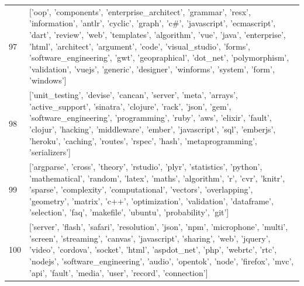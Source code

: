 \begin{center}
\begin{longtable}{|p{1.5cm}|p{12.5cm}|}
            97 & ['oop', 'components', 'enterprise\_architect', 'grammar', 'resx', 'information', 'antlr', 'cyclic', 'graph', 'c\#', 'javascript', 'ecmascript', 'dart', 'review', 'web', 'templates', 'algorithm', 'vue', 'java', 'enterprise', 'html', 'architect', 'argument', 'code', 'visual\_studio', 'forms', 'software\_engineering', 'gwt', 'geopraphical', 'dot\_net', 'polymorphism', 'validation', 'vuejs', 'generic', 'designer', 'winforms', 'system', 'form', 'windows']  \\ 
            98 & ['unit\_testing', 'devise', 'cancan', 'server', 'meta', 'arrays', 'active\_support', 'sinatra', 'clojure', 'rack', 'json', 'gem', 'software\_engineering', 'programming', 'ruby', 'aws', 'elixir', 'fault', 'clojur', 'hacking', 'middleware', 'ember', 'javascript', 'sql', 'emberjs', 'heroku', 'caching', 'routes', 'rspec', 'hash', 'metaprogramming', 'serializers']  \\ 
            99 & ['argparse', 'cross', 'theory', 'rstudio', 'plyr', 'statistics', 'python', 'mathematical', 'random', 'latex', 'maths', 'algorithm', 'r', 'cvr', 'knitr', 'sparse', 'complexity', 'computational', 'vectors', 'overlapping', 'geometry', 'matrix', 'c++', 'optimization', 'validation', 'dataframe', 'selection', 'faq', 'makefile', 'ubuntu', 'probability', 'git']  \\ 
            100 & ['server', 'flash', 'safari', 'resolution', 'json', 'npm', 'microphone', 'multi', 'screen', 'streaming', 'canvas', 'javascript', 'sharing', 'web', 'jquery', 'video', 'cordova', 'socket', 'html', 'aspdot\_net', 'php', 'webrtc', 'rtc', 'nodejs', 'software\_engineering', 'audio', 'opentok', 'node', 'firefox', 'mvc', 'api', 'fault', 'media', 'user', 'record', 'connection']  \\ 
            \hline
        \end{longtable}
        \end{center}
        
